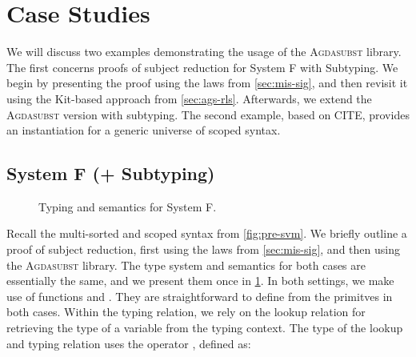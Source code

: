 \documentclass[screen,nonacm]{acmart}
\begin{document}
\section{Case Studies}\label{sec:ext}
We will discuss two examples demonstrating the usage of the \textsc{Agdasubst}
library. The first concerns proofs of subject reduction for System F with
Subtyping. We begin by presenting the proof using the laws from
\cref{sec:mis-sig}, and then revisit it using the Kit-based approach from
\cref{sec:ags-rls}. Afterwards, we extend the \textsc{Agdasubst} version with
subtyping. The second example, based on CITE, provides an instantiation for a
generic universe of scoped syntax.

\subsection{System F (+ Subtyping)}\label{sec:ext-syf}

\begin{figure}[!t]
      \small
      \centering
      \begin{minipage}[t]{0.48\linewidth}
            \small
            \raggedright{}
            \ETyping{}
      \end{minipage}
      \hfill
      \begin{minipage}[t]{0.48\linewidth}
            \small
            \raggedright{}
            \ESemantics{}
      \end{minipage}
      \caption{Typing and semantics for System F.}
      \label{fig:ext-tas}
\end{figure}

Recall the multi-sorted and scoped syntax from \cref{fig:pre-svm}. We briefly
outline a proof of subject reduction, first using the laws from
\cref{sec:mis-sig}, and then using the \textsc{Agdasubst} library. The type
system and semantics for both cases are essentially the same, and we present
them once in \cref{fig:ext-tas}. In both settings, we make use of functions
\EWk{} and \ESubst{}. They are straightforward to define from the primitves in
both cases. Within the typing relation, we rely on the lookup relation
\ELookup{} for retrieving the type of a variable from the typing context. The
type of the lookup and typing relation uses the operator ,
defined as:
\begin{minipage}[t]{0.48\linewidth}
      \raggedright{}
      \EUpArrow{}
\end{minipage}
\begin{minipage}[t]{0.48\linewidth}
      \raggedright{}
      \ETypeOf{}
\end{minipage}
\end{document}
